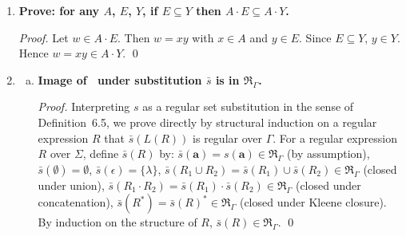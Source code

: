 \begin{enumerate}[{6.}1.]
\begin{enumerate}[(a)]
  \item The left-linear equations are
  \begin{align*}
    Y_0 &= \epsilon \cup Y_0\pmb{0} \cup Y_0\pmb{1},\\
    Y_1 &= Y_0\pmb{0},\\
    Y_2 &= Y_1\pmb{1},\\
    Y_3 &= Y_2\pmb{0},\\
    Y_4 &= Y_3\pmb{0},\\
    Y_5 &= Y_4\pmb{1},\\
    Y_6 &= Y_5\pmb{0} \cup Y_6\pmb{0} \cup Y_6\pmb{1}.
  \end{align*}
  Solving gives
  \[
  Y_0=(\pmb{0}\cup\pmb{1})^*,
  \quad
  Y_1=(\pmb{0}\cup\pmb{1})^*\pmb{0},
  \quad
  Y_2=(\pmb{0}\cup\pmb{1})^*\pmb{01},
  \]
  \[
  Y_3=(\pmb{0}\cup\pmb{1})^*\pmb{010},
  \quad
  Y_4=(\pmb{0}\cup\pmb{1})^*\pmb{0100},
  \quad
  Y_5=(\pmb{0}\cup\pmb{1})^*\pmb{01001},
  \]
  and
  \[
  Y_6=(\pmb{0}\cup\pmb{1})^*\pmb{010010}(\pmb{0}\cup\pmb{1})^*.
  \]
\end{enumerate}

\item \textbf{Prove: for any $A$, $E$, $Y$, if $E\subseteq Y$ then $A\cdot E\subseteq A\cdot Y$.}

\begin{proof}
Let $w\in A\cdot E$.  Then $w=xy$ with $x\in A$ and $y\in E$.  Since $E\subseteq Y$, $y\in Y$.  Hence $w=xy\in A\cdot Y$. \qed
\end{proof}

\item \begin{enumerate}[(a)]
  \item \textbf{Image of \RSIG\ under substitution $\bar{s}$ is in $\mathfrak{R}_\Gamma$.}

  \begin{proof}
  Interpreting $s$ as a regular set substitution in the sense of
  Definition~6.5, we prove directly by structural induction on a regular
  expression $R$ that $\bar{s}(L(R))$ is regular over $\Gamma$.
  For a regular expression $R$ over $\Sigma$, define $\bar{s}(R)$ by:
  $\bar{s}(\pmb{a})=s(\pmb{a})\in\mathfrak{R}_\Gamma$ (by assumption),
  $\bar{s}(\emptyset)=\emptyset$, $\bar{s}(\epsilon)=\{\lambda\}$,
  $\bar{s}(R_1\cup R_2)=\bar{s}(R_1)\cup\bar{s}(R_2)\in\mathfrak{R}_\Gamma$ (closed under union),
  $\bar{s}(R_1\cdot R_2)=\bar{s}(R_1)\cdot\bar{s}(R_2)\in\mathfrak{R}_\Gamma$ (closed under concatenation),
  $\bar{s}(R^*)=\bar{s}(R)^*\in\mathfrak{R}_\Gamma$ (closed under Kleene closure).
  By induction on the structure of $R$, $\bar{s}(R)\in\mathfrak{R}_\Gamma$. \qed
  \end{proof}


\end{enumerate}
\end{enumerate}
